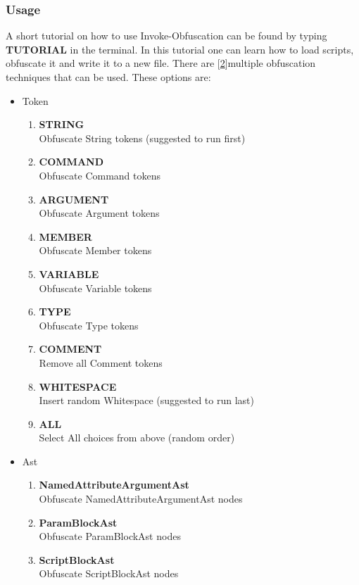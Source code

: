 \documentclass{article}%
\begin{document}
\subsubsection{Usage}
A short tutorial on how to use Invoke-Obfuscation can be found by typing \textbf{TUTORIAL} in the terminal. In this tutorial one can learn how to load scripts, obfuscate it and write it to a new file. There are [\hyperlink{2}{2}]multiple obfuscation techniques that can be used. These options are:
\begin{itemize}
	\item Token
	\begin{enumerate}
		\item \textbf{STRING}        
		\\Obfuscate String tokens (suggested to run first)
		\item \textbf{COMMAND}       
		\\Obfuscate Command tokens
		\item \textbf{ARGUMENT}      
		\\Obfuscate Argument tokens
		\item \textbf{MEMBER}        
		\\Obfuscate Member tokens
		\item \textbf{VARIABLE}      
		\\Obfuscate Variable tokens
		\item \textbf{TYPE}          
		\\Obfuscate Type tokens
		\item \textbf{COMMENT}       
		\\Remove all Comment tokens
		\item \textbf{WHITESPACE}    
		\\Insert random Whitespace (suggested to run last)
		\item \textbf{ALL}           
		\\Select All choices from above (random order)
	\end{enumerate}
	\item Ast
	\begin{enumerate}
		\item \textbf{NamedAttributeArgumentAst}  
			\\Obfuscate NamedAttributeArgumentAst nodes
		\item \textbf{ParamBlockAst}              
			\\Obfuscate ParamBlockAst nodes
		\item \textbf{ScriptBlockAst}             
			\\Obfuscate ScriptBlockAst nodes

\end{enumerate}
\end{itemize}
\end{document}
